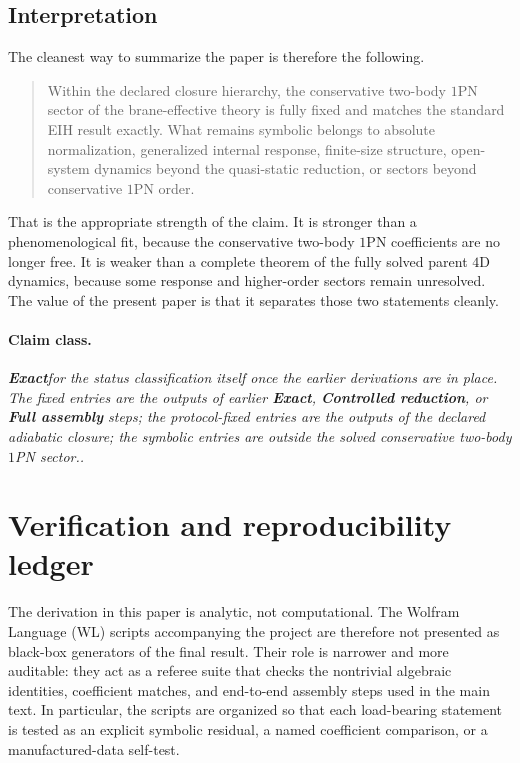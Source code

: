 \documentclass[11pt]{article}
\newcommand{\Exact}{\textbf{Exact}}
\newcommand{\Controlled}{\textbf{Controlled reduction}}
\newcommand{\FullMatch}{\textbf{Full assembly}}
\newcommand{\claimclass}[1]{\paragraph{Claim class.}\emph{#1.}}
\begin{document}
\subsection{Interpretation}
\label{sec:interpretation-fixed-symbolic}

The cleanest way to summarize the paper is therefore the following.

\begin{quote}
Within the declared closure hierarchy, the conservative two-body \(1\)PN sector of the
brane-effective theory is fully fixed and matches the standard EIH result exactly. What
remains symbolic belongs to absolute normalization, generalized internal response,
finite-size structure, open-system dynamics beyond the quasi-static reduction, or sectors
beyond conservative \(1\)PN order.
\end{quote}

That is the appropriate strength of the claim. It is stronger than a phenomenological fit,
because the conservative two-body \(1\)PN coefficients are no longer free. It is weaker
than a complete theorem of the fully solved parent \(4\)D dynamics, because some response
and higher-order sectors remain unresolved. The value of the present paper is that it
separates those two statements cleanly.

\claimclass{\Exact for the status classification itself once the earlier derivations are in
place. The fixed entries are the outputs of earlier \Exact, \Controlled, or \FullMatch
steps; the protocol-fixed entries are the outputs of the declared adiabatic closure; the
symbolic entries are outside the solved conservative two-body \(1\)PN sector.}

\section{Verification and reproducibility ledger}
\label{sec:verification}

The derivation in this paper is analytic, not computational. The Wolfram Language (WL)
scripts accompanying the project are therefore not presented as black-box generators of the
final result. Their role is narrower and more auditable: they act as a referee suite that
checks the nontrivial algebraic identities, coefficient matches, and end-to-end assembly
steps used in the main text. In particular, the scripts are organized so that each
load-bearing statement is tested as an explicit symbolic residual, a named coefficient
comparison, or a manufactured-data self-test.
\end{document}
